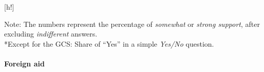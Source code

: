 \documentclass{nature}
\makeatletter
\renewenvironment*{figure}{\@float{figure}}{\end@float}
\makeatother
\begin{document}
\begin{figure}[h!]
  \caption[Relative support for further global policies]{Relative support for various global policies. %
  (Questions 44 and 45 in Supplementary Section D; See Figure A24 for the absolute support.)%
  }
  \label{fig:support}
  {\footnotesize Note: The numbers represent the percentage of \textit{somewhat} or \textit{strong support}, after excluding \textit{indifferent} answers. \\
  *Except for the GCS: Share of ``Yes'' in a simple \textit{Yes/No} question. } 
\end{figure} 


\paragraph{Foreign aid}\label{subsubsec:support_foreign_aid} %
\end{document}
